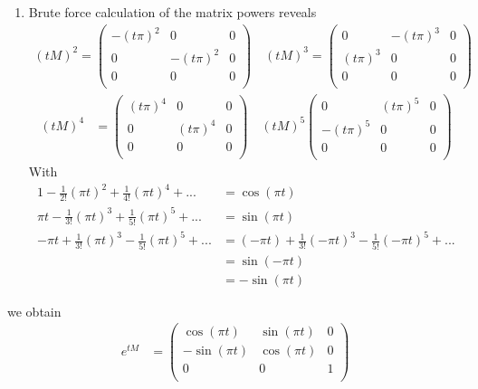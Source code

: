 \documentclass[10pt,a4paper]{article}
\theoremstyle{definition}
\begin{document}
\begin{enumerate}
\item Brute force calculation of the matrix powers reveals
\begin{align}
(tM)^2=\left(
\begin{array}{ccc}
 -(t\pi)^2 & 0 & 0 \\
 0 & -(t\pi)^2 & 0 \\
 0 & 0 & 0 \\
\end{array}
\right)\quad
(tM)^3=\left(
\begin{array}{ccc}
 0 & -(t\pi)^3 & 0 \\
 (t\pi)^3 & 0 & 0 \\
 0 & 0 & 0 \\
\end{array}
\right)
\end{align}
\begin{align}
(tM)^4&=\left(
\begin{array}{ccc}
(t\pi)^4 & 0 & 0 \\
 0 & (t\pi)^4 & 0 \\
 0 & 0 & 0 \\
\end{array}
\right)\quad
(tM)^5\left(
\begin{array}{ccc}
 0 & (t\pi)^5 & 0 \\
 -(t\pi)^5 & 0 & 0 \\
 0 & 0 & 0 \\
\end{array}
\right)
\end{align}
With
\begin{align}
    1-\frac{1}{2!}(\pi t)^2+\frac{1}{4!}(\pi t)^4+...&=\cos(\pi t)\\
    \pi t - \frac{1}{3!}(\pi t)^3+ \frac{1}{5!}(\pi t)^5+...&=\sin(\pi t)\\
    -\pi t + \frac{1}{3!}(\pi t)^3- \frac{1}{5!}(\pi t)^5+...&=(-\pi t) + \frac{1}{3!}(-\pi t)^3- \frac{1}{5!}(-\pi t)^5+...\\
    &=\sin(-\pi t)\\
    &=-\sin(\pi t)
\end{align}
\end{enumerate}
we obtain
\begin{align}
e^{tM}&=\left(
\begin{array}{ccc}
 \cos(\pi t) & \sin(\pi t) & 0 \\
 -\sin(\pi t) & \cos(\pi t) & 0 \\
 0 & 0 & 1 \\
\end{array}
\right)
\end{align}
\end{document}
